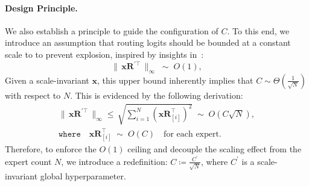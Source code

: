 \documentclass{llmxive}
\providecommand{\bm}[1]{\boldsymbol{#1}}
\providecommand{\vx}{{\bm{x}}}
\providecommand{\mR}{{\bm{R}}}
\begin{document}
\paragraph{Design Principle.} We also establish a principle to guide the configuration of $C$.
To this end, we introduce an assumption that routing logits should be bounded at a constant scale to to prevent explosion, inspired by insights in~\citep{scion}:
\[
    {\| \, \vx\mR^{\prime\top} \, \|_{\infty}} \; \sim \; O(1),
\]
Given a scale-invariant $\mathbf{x}$, this upper bound inherently implies that $C \sim \Theta(\frac{1}{\sqrt{N}})$ with respect to $N$.
This is evidenced by the following derivation:
\begin{gather}
    \| \, \vx\mR^{\prime\top} \, \|_{\infty} \le \, \sqrt{\sum_{i=1}^N{(\vx\mR_{[i]}^\top)^2}} \; \sim \; O(C\sqrt{N}), \nonumber \\
    \texttt{where} \quad \vx\mR_{[i]}^\top \; \sim \; O(C) \quad \text{for each expert}.
\end{gather}
Therefore, to enforce the $O(1)$ ceiling and decouple the scaling effect from the expert count $N$, we introduce a redefinition: $C \coloneqq \frac{C^\prime}{\sqrt{N}}$, where $C^\prime$ is a scale-invariant global hyperparameter.
\end{document}
